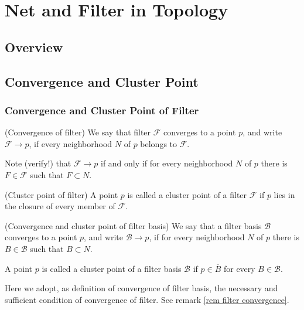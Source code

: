 \documentclass{report}
\begin{document}
\section{Net and Filter in Topology}

\subsection{Overview}

\subsection{Convergence and Cluster Point}
\subsubsection{Convergence and Cluster Point of Filter}

\begin{dfn} (Convergence of filter)
    We say that filter \( \mathscr{F} \) converges to a point \( p \), and write \( \mathscr{F} \to p \), if every neighborhood \( N \) of \( p \) belongs to \( \mathscr{F} \).
\end{dfn}

\begin{rem}\label{rem filter convergence}
    Note (verify!) that \( \mathscr{F} \to p \) if and only if for every neighborhood \( N \) of \( p \) there is \( F \in \mathscr{F} \) such that \( F \subset N \).
\end{rem}

\begin{dfn} (Cluster point of filter)
    A point \( p \) is called a cluster point of a filter \( \mathscr{F} \) if \( p \) lies in the closure of every member of \( \mathscr{F} \).
\end{dfn}


\begin{dfn} (Convergence and cluster point of filter basis)
    We say that a filter basis \( \mathscr{B} \) converges to a point \( p \), and write \( \mathscr{B} \to p \), if for every neighborhood \( N \) of \( p \) there is \( B \in \mathscr{B} \) such that \( B \subset N \).

    A point \( p \) is called a cluster point of a filter basis \( \mathscr{B} \) if \( p \in \overline{B} \) for every \( B \in \mathscr{B} \).
\end{dfn}

\begin{rem}
    Here we adopt, as definition of convergence of filter basis, the necessary and sufficient condition of convergence of filter. See remark \ref{rem filter convergence}.
\end{rem}
\end{document}
